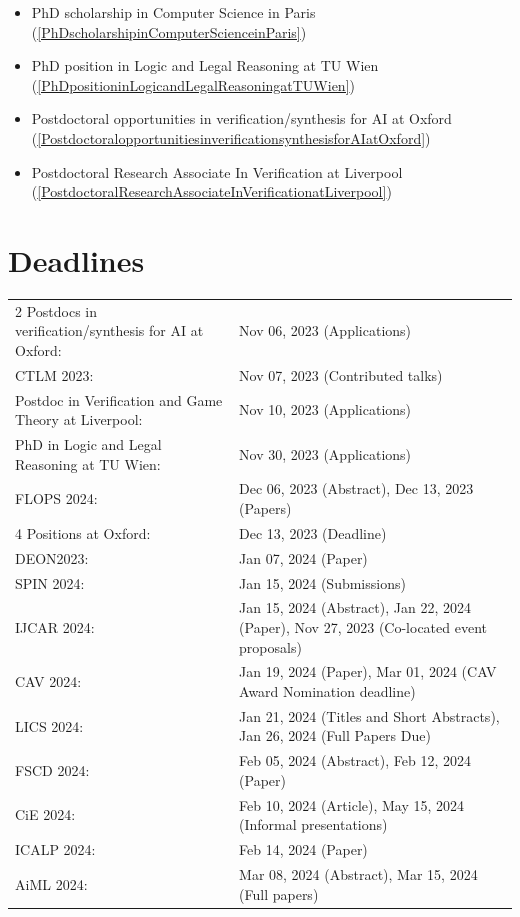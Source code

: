 \documentclass[prodmode,acmtecs]{acmsmall} %
\begin{document}
\begin{itemize}
\begin{itemize}\item PhD scholarship in Computer Science in Paris (\cref{PhDscholarshipinComputerScienceinParis})
\item PhD position in Logic and Legal Reasoning at TU Wien (\cref{PhDpositioninLogicandLegalReasoningatTUWien})
\item Postdoctoral opportunities in verification/synthesis for AI at Oxford (\cref{PostdoctoralopportunitiesinverificationsynthesisforAIatOxford})
\item Postdoctoral Research Associate In Verification at Liverpool (\cref{PostdoctoralResearchAssociateInVerificationatLiverpool})
\end{itemize} 
\end{itemize}\section{Deadlines}\label{deadlines}\begin{tabulary}{\linewidth}{LL}2 Postdocs in verification/synthesis for AI at Oxford:  & Nov 06, 2023 (Applications) \\
CTLM 2023:  & Nov 07, 2023 (Contributed talks) \\
Postdoc in Verification and Game Theory at Liverpool:  & Nov 10, 2023 (Applications) \\
PhD in Logic and Legal Reasoning at TU Wien:  & Nov 30, 2023 (Applications) \\
FLOPS 2024:  & Dec 06, 2023 (Abstract), Dec 13, 2023 (Papers) \\
4 Positions at Oxford:  & Dec 13, 2023 (Deadline) \\
DEON2023:  & Jan 07, 2024 (Paper) \\
SPIN 2024:  & Jan 15, 2024 (Submissions) \\
IJCAR 2024:  & Jan 15, 2024 (Abstract), Jan 22, 2024 (Paper), Nov 27, 2023 (Co-located event proposals) \\
CAV 2024:  & Jan 19, 2024 (Paper), Mar 01, 2024 (CAV Award Nomination deadline) \\
LICS 2024:  & Jan 21, 2024 (Titles and Short Abstracts), Jan 26, 2024 (Full Papers Due) \\
FSCD 2024:  & Feb 05, 2024 (Abstract), Feb 12, 2024 (Paper) \\
CiE 2024:  & Feb 10, 2024 (Article), May 15, 2024 (Informal presentations) \\
ICALP 2024:  & Feb 14, 2024 (Paper) \\
AiML 2024:  & Mar 08, 2024 (Abstract), Mar 15, 2024 (Full papers) \\
\end{tabulary}
\end{document}

